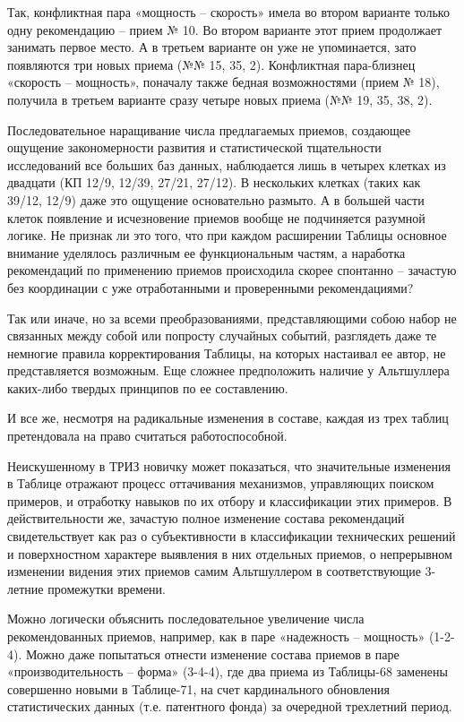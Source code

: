 \documentclass[11pt,a4paper]{article}
\begin{document}
Так, конфликтная пара «мощность -- скорость» имела во втором варианте только
одну рекомендацию -- прием № 10. Во втором варианте этот прием продолжает
занимать первое место. А в третьем варианте он уже не упоминается, зато
появляются три новых приема (№№ 15, 35, 2). Конфликтная пара-близнец «скорость
-- мощность», поначалу также бедная возможностями (прием № 18), получила в
третьем варианте сразу четыре новых приема (№№ 19, 35, 38, 2).

Последовательное наращивание числа предлагаемых приемов, создающее ощущение
закономерности развития и статистической тщательности исследований все больших
баз данных, наблюдается лишь в четырех клетках из двадцати (КП 12/9, 12/39,
27/21, 27/12). В нескольких клетках (таких как 39/12, 12/9) даже это ощущение
основательно размыто. А в большей части клеток появление и исчезновение
приемов вообще не подчиняется разумной логике. Не признак ли это того, что при
каждом расширении Таблицы основное внимание уделялось различным ее
функциональным частям, а наработка рекомендаций по применению приемов
происходила скорее спонтанно -- зачастую без координации с уже отработанными и
проверенными рекомендациями?

Так или иначе, но за всеми преобразованиями, представляющими собою набор не
связанных между собой или попросту случайных событий, разглядеть даже те
немногие правила корректирования Таблицы, на которых настаивал ее автор, не
представляется возможным. Еще сложнее предположить наличие у Альтшуллера
каких-либо твердых принципов по ее составлению.

И все же, несмотря на радикальные изменения в составе, каждая из трех таблиц
претендовала на право считаться работоспособной.

Неискушенному в ТРИЗ новичку может показаться, что значительные изменения в
Таблице отражают процесс оттачивания механизмов, управляющих поиском примеров,
и отработку навыков по их отбору и классификации этих примеров. В
действительности же, зачастую полное изменение состава рекомендаций
свидетельствует как раз о субъективности в классификации технических решений и
поверхностном характере выявления в них отдельных приемов, о непрерывном
изменении видения этих приемов самим Альтшуллером в соответствующие 3-летние
промежутки времени.

Можно логически объяснить последовательное увеличение числа рекомендованных
приемов, например, как в паре «надежность -- мощность» (1-2-4). Можно даже
попытаться отнести изменение состава приемов в паре «производительность --
форма» (3-4-4), где два приема из Таблицы-68 заменены совершенно новыми в
Таблице-71, на счет кардинального обновления статистических данных
(т.е. патентного фонда) за очередной трехлетний период.
\end{document}
